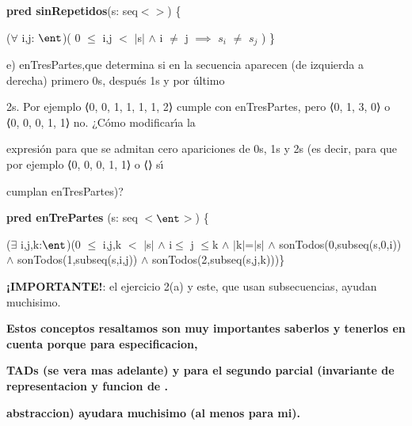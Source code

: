 \documentclass[10pt,a4paper]{article}
\begin{document}
\textbf{pred sinRepetidos}(s: seq$<$\ent$>$) \{

($\forall$ i,j: $\ent$)( 0 $\leq$ i,j $<$ $|$s$|$ $\wedge$ i $\neq$ j $\implies$ $s_i$ $\neq$ $s_j$ ) \}

\vspace{0.3cm}

e) enTresPartes,que determina si en la secuencia aparecen (de izquierda a derecha) primero 0s, después 1s y por último 

2s. Por ejemplo ⟨0, 0, 1, 1, 1, 1, 2⟩ cumple con enTresPartes, pero ⟨0, 1, 3, 0⟩ o ⟨0, 0, 0, 1, 1⟩ no. ¿Cómo modificarı́a la 

expresión para que se admitan cero apariciones de 0s, 1s y 2s (es decir, para que por ejemplo ⟨0, 0, 0, 1, 1⟩ o ⟨⟩ sı́ 

cumplan enTresPartes)?

\textbf{pred enTrePartes} (s: seq $<$$\ent$$>$) \{ 

($\exists$ i,j,k:$\ent$)(0 $\leq$ i,j,k $<$ $|$s$|$ $\wedge$ i$\leq$ j $\leq$k  $\wedge$ $|$k$|$=$|$s$|$ $\wedge$ sonTodos(0,subseq(s,0,i)) $\wedge$ sonTodos(1,subseq(s,i,j)) $\wedge$ sonTodos(2,subseq(s,j,k)))\}

\vspace{0.1cm}

\textbf{¡IMPORTANTE!}: el ejercicio 2(a) y este, que usan subsecuencias, ayudan muchisimo.


\vspace{0.5cm}

\textbf{Estos conceptos resaltamos son muy importantes saberlos y tenerlos en cuenta porque para especificacion,}

\textbf{TADs (se vera mas adelante) y para el segundo parcial (invariante de representacion y funcion de .}

\textbf{abstraccion) ayudara muchisimo (al menos para mi).}
\end{document}
